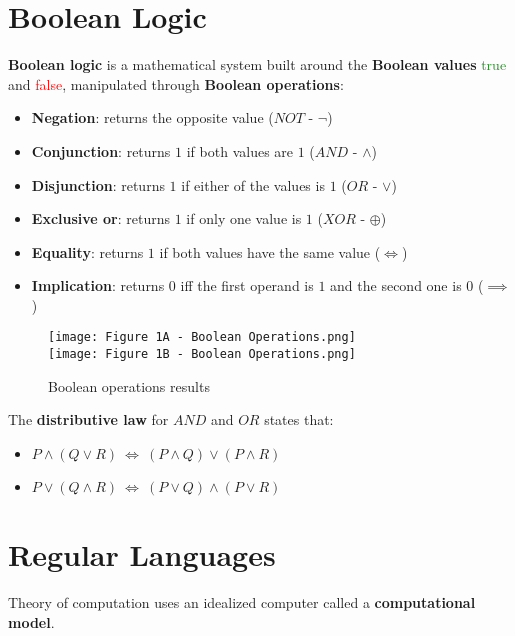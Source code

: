 \documentclass{article}
\begin{document}
\newpage

\section{Boolean Logic}
\textbf{Boolean logic} is a mathematical system built around the \textbf{Boolean values} \textcolor{ForestGreen}{true} and \textcolor{red}{false}, manipulated through \textbf{Boolean operations}:
\begin{itemize}
    \item \textbf{Negation}: returns the opposite value ($NOT$ - $\neg$)
    \item \textbf{Conjunction}: returns $1$ if both values are $1$ ($AND$ - $\land$)
    \item \textbf{Disjunction}: returns $1$ if either of the values is $1$ ($OR$ - $\lor$) 
    \item \textbf{Exclusive or}: returns $1$ if only one value is $1$ ($XOR$ - $\oplus$)
    \item \textbf{Equality}: returns $1$ if both values have the same value ($\iff$)
    \item \textbf{Implication}: returns $0$ iff the first operand is $1$ and the second one is $0$ ($\implies$)
\end{itemize}
\begin{figure}[H]
    \centering
    \texttt{[image: Figure 1A - Boolean Operations.png]}
    \vspace{0.2cm}\\
    \texttt{[image: Figure 1B - Boolean Operations.png]}
    \caption{Boolean operations results}
\end{figure}
The \textbf{distributive law} for $AND$ and $OR$ states that:
\begin{itemize}
    \item $P \land (Q \lor R) \ \iff \ (P \land Q) \lor (P \land R)$
    \item $P \lor (Q \land R) \ \iff \ (P \lor Q) \land (P \lor R)$
\end{itemize}

\newpage

\section{Regular Languages}
Theory of computation uses an idealized computer called a \textbf{computational model}. 
\end{document}

